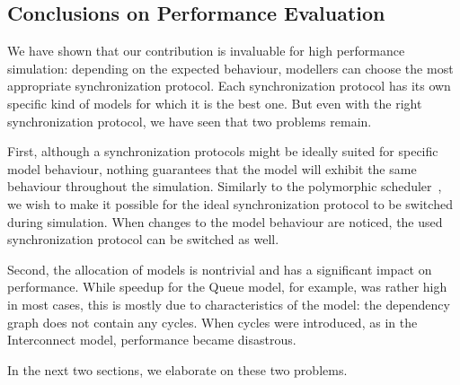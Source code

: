 \subsection{Conclusions on Performance Evaluation}
We have shown that our contribution is invaluable for high performance simulation: depending on the expected behaviour, modellers can choose the most appropriate synchronization protocol.
Each synchronization protocol has its own specific kind of models for which it is the best one.
But even with the right synchronization protocol, we have seen that two problems remain.

First, although a synchronization protocols might be ideally suited for specific model behaviour, nothing guarantees that the model will exhibit the same behaviour throughout the simulation.
Similarly to the polymorphic scheduler~\cite{MasterThesis}, we wish to make it possible for the ideal synchronization protocol to be switched during simulation.
When changes to the model behaviour are noticed, the used synchronization protocol can be switched as well. 

Second, the allocation of models is nontrivial and has a significant impact on performance.
While speedup for the Queue model, for example, was rather high in most cases, this is mostly due to characteristics of the model: the dependency graph does not contain any cycles.
When cycles were introduced, as in the Interconnect model, performance became disastrous.

In the next two sections, we elaborate on these two problems.
